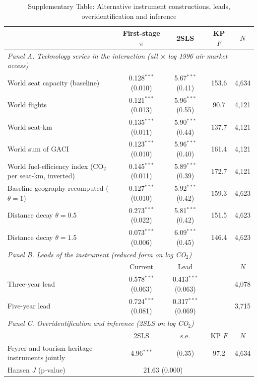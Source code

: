 \begin{table}[htbp]
\centering
\begin{threeparttable}
\caption{Supplementary Table: Alternative instrument constructions, leads, overidentification and inference}
\label{tab:exclusion2}
\scriptsize
\begin{tabular}{lcccc}
\toprule
 & First-stage $\pi$ & 2SLS & KP $F$ & $N$ \\
\midrule
\multicolumn{5}{l}{\textit{Panel A. Technology series in the interaction (all $\times$ log 1996 air market access)}} \\
  World seat capacity (baseline) & 0.128$^{***}$ (0.010) & 5.67$^{***}$ (0.41) & 153.6 & 4,634 \\
  World flights & 0.121$^{***}$ (0.013) & 5.96$^{***}$ (0.55) & 90.7 & 4,121 \\
  World seat-km & 0.135$^{***}$ (0.011) & 5.90$^{***}$ (0.44) & 137.7 & 4,121 \\
  World sum of GACI & 0.123$^{***}$ (0.010) & 5.96$^{***}$ (0.40) & 161.4 & 4,121 \\
  World fuel-efficiency index (CO$_2$ per seat-km, inverted) & 0.145$^{***}$ (0.011) & 5.89$^{***}$ (0.39) & 172.7 & 4,121 \\
  Baseline geography recomputed ($\theta = 1$) & 0.127$^{***}$ (0.010) & 5.92$^{***}$ (0.42) & 159.3 & 4,623 \\
  Distance decay $\theta = 0.5$ & 0.273$^{***}$ (0.022) & 5.81$^{***}$ (0.42) & 151.5 & 4,623 \\
  Distance decay $\theta = 1.5$ & 0.073$^{***}$ (0.006) & 6.09$^{***}$ (0.45) & 146.4 & 4,623 \\
\midrule
\multicolumn{5}{l}{\textit{Panel B. Leads of the instrument (reduced form on log CO$_2$)}} \\
 & Current & Lead & & $N$ \\
  Three-year lead & 0.578$^{***}$ (0.063) & 0.413$^{***}$ (0.063) & & 4,078 \\
  Five-year lead & 0.724$^{***}$ (0.081) & 0.317$^{***}$ (0.069) & & 3,715 \\
\midrule
\multicolumn{5}{l}{\textit{Panel C. Overidentification and inference (2SLS on log CO$_2$)}} \\
 & 2SLS & s.e. & KP $F$ & $N$ \\
  Feyrer and tourism-heritage instruments jointly & 4.96$^{***}$ & (0.35) & 97.2 & 4,634 \\
  \quad Hansen $J$ (p-value) & \multicolumn{2}{c}{21.63 (0.000)} & & \\

\end{tabular}
\end{threeparttable}
\end{table}
